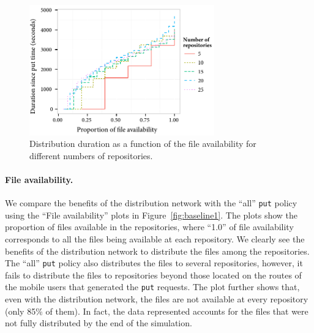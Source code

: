 \begin{figure}
    \vspace{-15pt}
    \centering
    \includegraphics[width=8cm]{figures/propagationTimes.pdf}
    \caption{Distribution duration as a function of the file availability for different numbers of repositories. 
    }
    \label{fig:propagationTimes}
\end{figure}
\paragraph{File availability.} 
We compare the benefits of the distribution network with the ``all''  \texttt{put} policy using the ``File availability'' plots in Figure~\ref{fig:baseline1}. The plots show the proportion of files available in the repositories, where ``1.0'' of file availability corresponds to all the files being available at each repository. We clearly see the benefits of the distribution network to distribute the files among the repositories. The ``all'' \texttt{put} policy also distributes the files to several repositories, however, it fails to distribute the files to repositories beyond those located on the routes of the mobile users that generated the \texttt{put} requests. The plot further shows that, even with the distribution network, the files are not available at every repository (only 85\% of them). In fact, the data represented accounts for the files that were not fully distributed by the end of the simulation. 

